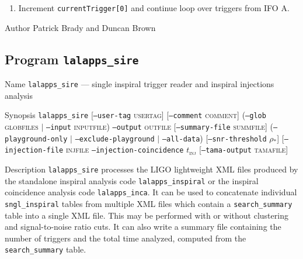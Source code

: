 \begin{entry}
\begin{enumerate}
\begin{enumerate}
\item Increment \texttt{currentTrigger[0]} and continue loop over triggers
from IFO A.
\end{enumerate}
\end{enumerate}

\item[Author] 
Patrick Brady and Duncan Brown
\end{entry}


\clearpage
\subsection{Program \texttt{lalapps\_sire}}
\label{program:lalapps-sire}

\begin{entry}
\item[Name]
\verb$lalapps_sire$ --- single inspiral trigger reader and inspiral injections
analysis

\item[Synopsis]
\verb$lalapps_sire$  \newline
%
[\texttt{--user-tag} \textsc{usertag}] 
[\texttt{--comment} \textsc{comment}] \newline
%
(\texttt{--glob} \textsc{globfiles} $|$ \texttt{--input} \textsc{inputfile})
\texttt{--output} \textsc{outfile}
[\texttt{--summary-file} \textsc{summfile}] \newline
%
(\texttt{--playground-only} $|$ 
\texttt{--exclude-playground} $|$
\texttt{--all-data})\newline
%
[\texttt{--snr-threshold} \textsc{$\rho_\ast$}]\newline
%
[\texttt{--injection-file} \textsc{injfile} 
\texttt{--injection-coincidence} \textsc{$t_\mathrm{inj}$}\newline
{}\newline
%
[\texttt{--tama-output} \textsc{tamafile}] 

\item[Description] 
\verb$lalapps_sire$ processes the LIGO lightweight XML files produced by the
standalone inspiral analysis code \verb$lalapps_inspiral$ or the inspiral
coincidence analysis code \verb$lalapps_inca$. It can be used to concatenate
individual \verb$sngl_inspiral$ tables from multiple XML files which contain a
\verb$search_summary$ table into a single XML file. This may be performed with
or without clustering and signal-to-noise ratio cuts. It can also write a
summary file containing the number of triggers and the total time analyzed,
computed from the \verb$search_summary$ table.


\end{entry}
